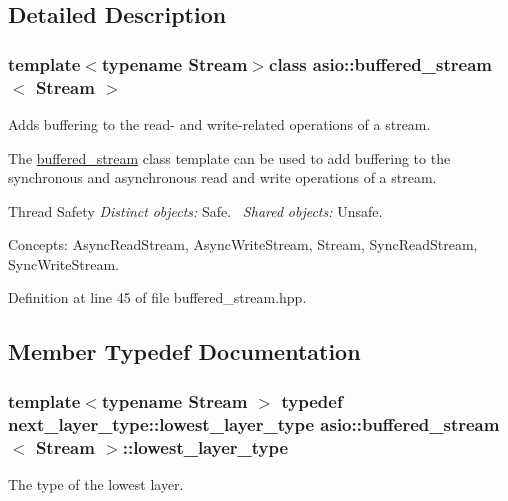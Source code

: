 \subsection{Detailed Description}
\subsubsection*{template$<$typename Stream$>$class asio\+::buffered\+\_\+stream$<$ Stream $>$}

Adds buffering to the read-\/ and write-\/related operations of a stream. 

The \hyperlink{classasio_1_1buffered__stream}{buffered\+\_\+stream} class template can be used to add buffering to the synchronous and asynchronous read and write operations of a stream.

\begin{DoxyParagraph}{Thread Safety}
{\itshape Distinct} {\itshape objects\+:} Safe.~\newline
{\itshape Shared} {\itshape objects\+:} Unsafe.
\end{DoxyParagraph}
\begin{DoxyParagraph}{Concepts\+:}
Async\+Read\+Stream, Async\+Write\+Stream, Stream, Sync\+Read\+Stream, Sync\+Write\+Stream. 
\end{DoxyParagraph}


Definition at line 45 of file buffered\+\_\+stream.\+hpp.



\subsection{Member Typedef Documentation}
\hypertarget{classasio_1_1buffered__stream_aed77dcc210c8f8bc905715340a498bc2}{}
\subsubsection[{lowest\+\_\+layer\+\_\+type}]{\setlength{\rightskip}{0pt plus 5cm}template$<$typename Stream $>$ typedef next\+\_\+layer\+\_\+type\+::lowest\+\_\+layer\+\_\+type {\bf asio\+::buffered\+\_\+stream}$<$ Stream $>$\+::{\bf lowest\+\_\+layer\+\_\+type}}\label{classasio_1_1buffered__stream_aed77dcc210c8f8bc905715340a498bc2}


The type of the lowest layer. 



